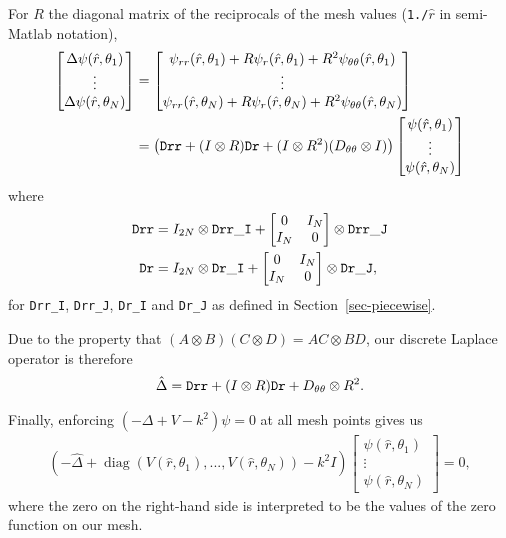 For $R$ the diagonal matrix of the reciprocals of
the mesh values ({\tt 1./}$\hat{r}$ in semi-Matlab notation), 
\begin{align*}
 \begin{bmatrix}
  \Delta\psi(\hat{r},\theta_1) \\ \vdots \\
  \Delta\psi(\hat{r},\theta_N)
 \end{bmatrix}
 &=
 \begin{bmatrix}
  \psi_{rr}(\hat{r},\theta_1) +
  R\psi_r(\hat{r},\theta_1) +
  R^2\psi_{\theta\theta}(\hat{r},\theta_1) \\ \vdots \\
  \psi_{rr}(\hat{r},\theta_N) +
  R\psi_r(\hat{r},\theta_N) +
  R^2\psi_{\theta\theta}(\hat{r},\theta_N)
 \end{bmatrix} \\
 &=
 \left( {\tt Drr} + (I \otimes R) {\tt Dr}
                  + (I \otimes R^2) (D_{\theta\theta} \otimes I)
 \right)
 \begin{bmatrix}
  \psi(\hat{r},\theta_1) \\ 
  \vdots \\ 
  \psi(\hat{r},\theta_N)
 \end{bmatrix}
\end{align*}
where
\begin{align*}
 {\tt Drr} &= I_{2N} \otimes {\tt Drr\_I} + 
              \begin{bmatrix}0 & I_N \\ I_N & 0\end{bmatrix}
              \otimes {\tt Drr\_J} \\ 
 {\tt Dr}  &= I_{2N} \otimes {\tt Dr\_I} + 
              \begin{bmatrix}0 & I_N \\ I_N & 0\end{bmatrix}
              \otimes {\tt Dr\_J},
\end{align*}
for {\tt Drr\_I}, {\tt Drr\_J}, {\tt Dr\_I} and {\tt Dr\_J}
as defined in Section~\ref{sec-piecewise}.

Due to the property that $(A \otimes B)(C \otimes D) = 
AC \otimes BD$, our discrete Laplace operator is
therefore
\begin{align*}
 \hat{\Delta} = {\tt Drr} + (I \otimes R){\tt Dr} + D_{\theta\theta} \otimes R^2.
\end{align*}

Finally, enforcing $(-\Delta + V - k^2)\psi = 0$ at all mesh points
gives us
\begin{align*}
 \left(
  -\hat{\Delta} 
  +\operatorname{diag}(V(\hat{r},\theta_1),...,V(\hat{r},\theta_N))
  -k^2 I 
 \right)
 \begin{bmatrix}
  \psi(\hat{r},\theta_1) \\ \vdots \\ \psi(\hat{r},\theta_N)
 \end{bmatrix} = 0,
\end{align*}
where the zero on the right-hand side is interpreted to be the values
of the zero function on our mesh.
